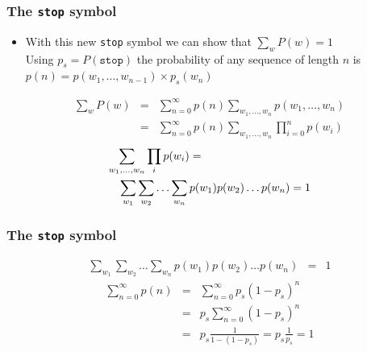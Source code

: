 \begin{frame}
\frametitle{The {\tt stop} symbol}
\begin{itemize}[<+->]
\item With this new {\tt stop} symbol we can show that $\sum_w P(w) = 1$ \\
Using $p_s = P(\texttt{stop})$ the probability of any sequence of length $n$ is $p(n) = p(w_1, \ldots, w_{n-1}) \times p_s(w_n)$ \\
\end{itemize}
\begin{eqnarray*}
\sum_w P(w) &=& \sum_{n=0}^{\infty} p(n) \sum_{w_1, \ldots, w_n} p(w_1, \ldots, w_n) \\
&=& \sum_{n=0}^{\infty} p(n) \sum_{w_1, \ldots, w_n} \prod_{i=0}^n p(w_i)
\end{eqnarray*}
\begin{eqnarray*}
\lefteqn{\sum_{w_1, \ldots, w_n} \prod_i p(w_i) = } \\
&& \sum_{w_1} \sum_{w_2} \ldots \sum_{w_n} p(w_1) p(w_2) \ldots p(w_n) = 1
\end{eqnarray*}
\end{frame}

\begin{frame}
\frametitle{The {\tt stop} symbol}
\begin{eqnarray*}
\sum_{w_1} \sum_{w_2} \ldots \sum_{w_n} p(w_1) p(w_2) \ldots p(w_n) &=& 1
\end{eqnarray*}
\begin{eqnarray*}
\sum_{n=0}^\infty p(n) &=& \sum_{n=0}^\infty p_s(1 - p_s)^n \\
&=& p_s \sum_{n=0}^\infty (1 - p_s)^n \\
&=& p_s \frac{1}{1-(1-p_s)} = p_s \frac{1}{p_s} = 1
\end{eqnarray*}
\end{frame}




 